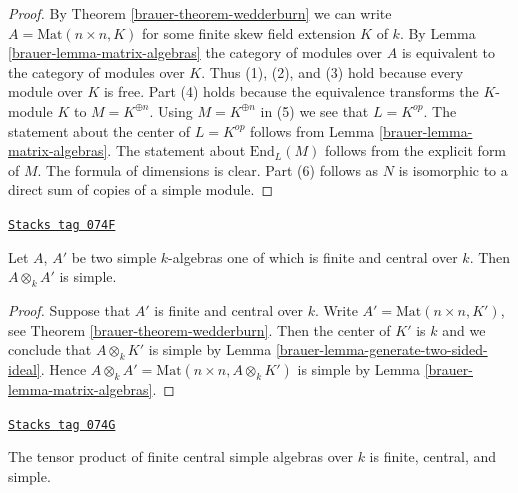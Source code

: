 \begin{proof}

By
Theorem \ref{brauer-theorem-wedderburn}
we can write $A = \text{Mat}(n \times n, K)$ for some finite skew
field extension $K$ of $k$. By
Lemma \ref{brauer-lemma-matrix-algebras}
the category of modules over $A$ is equivalent to the category of
modules over $K$. Thus (1), (2), and (3) hold
because every module over $K$ is free. Part (4) holds
because the equivalence transforms the $K$-module $K$
to $M = K^{\oplus n}$. Using $M = K^{\oplus n}$ in (5)
we see that $L = K^{op}$. The statement about the center of $L = K^{op}$
follows from
Lemma \ref{brauer-lemma-matrix-algebras}.
The statement about $\text{End}_L(M)$ follows from the explicit form
of $M$. The formula of dimensions is clear.
Part (6) follows as $N$ is isomorphic to a direct sum of
copies of a simple module.
\end{proof}

\begin{lemma}
\label{brauer-lemma-tensor-simple}
\href{https://stacks.math.columbia.edu/tag/074F}{\texttt{Stacks tag 074F}}

Let $A$, $A'$ be two simple $k$-algebras one of which is finite and central
over $k$. Then $A \otimes_k A'$ is simple.
\end{lemma}

\begin{proof}

Suppose that $A'$ is finite and central over $k$.
Write $A' = \text{Mat}(n \times n, K')$, see
Theorem \ref{brauer-theorem-wedderburn}.
Then the center of $K'$ is $k$ and we conclude that
$A \otimes_k K'$ is simple by
Lemma \ref{brauer-lemma-generate-two-sided-ideal}.
Hence $A \otimes_k A' = \text{Mat}(n \times n, A \otimes_k K')$ is simple
by Lemma \ref{brauer-lemma-matrix-algebras}.
\end{proof}

\begin{lemma}
\label{brauer-lemma-tensor-central-simple}
\href{https://stacks.math.columbia.edu/tag/074G}{\texttt{Stacks tag 074G}}

The tensor product of finite central simple algebras over $k$ is finite,
central, and simple.
\end{lemma}

